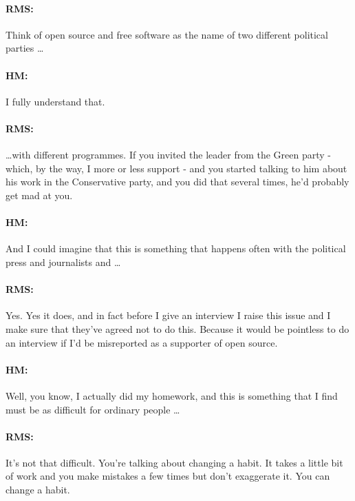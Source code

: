 \paragraph{RMS:}{Think of open source and free software as the name of two
dif\hbox{}ferent political parties \dots}

\paragraph{HM:}{I fully understand that.}

\paragraph{RMS:}{\dots with dif\hbox{}ferent programmes. If you invited the
leader from the Green party - which, by the way, I more or less support - and
you started talking to him about his work in the Conservative party, and you did
that several times, he'd probably get mad at you.}

\paragraph{HM:}{And I could imagine that this is something that happens often
with the political press and journalists and \dots}

\paragraph{RMS:}{Yes. Yes it does, and in fact before I give an interview I
raise this issue and I make sure that they've agreed not to do this. Because it
would be pointless to do an interview if I'd be misreported as a supporter of
open source.}

\paragraph{HM:}{Well, you know, I actually did my homework, and this is
something that I f\hbox{}ind must be as dif\hbox{}f\hbox{}icult for ordinary
people \dots}

\paragraph{RMS:}{It's not that dif\hbox{}f\hbox{}icult. You're talking about
changing a habit.  It takes a little bit of work and you make mistakes a few
times but don't exaggerate it. You can change a habit.}

